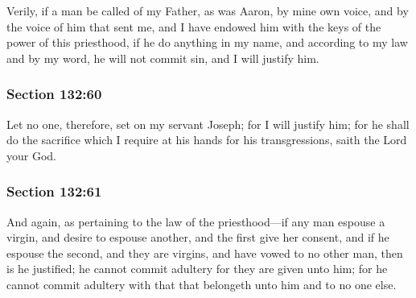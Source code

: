 		Verily, if a man be called of my Father, as was Aaron, by mine own voice, and by the voice of him that sent me, and I have endowed him with the keys of the power of this priesthood, if he do anything in my name, and according to my law and by my word, he will not commit sin, and I will justify him.


	\subsubsection{Section 132:60} %
		\label{DC132-60}

		Let no one, therefore, set on my servant Joseph; for I will justify him; for he shall do the sacrifice which I require at his hands for his transgressions, saith the Lord your God.


	\subsubsection{Section 132:61} %
		\label{DC132-61}

		And again, as pertaining to the law of the priesthood---if any man espouse a virgin, and desire to espouse another, and the first give her consent, and if he espouse the second, and they are virgins, and have vowed to no other man, then is he justified; he cannot commit adultery for they are given unto him; for he cannot commit adultery with that that belongeth unto him and to no one else.


